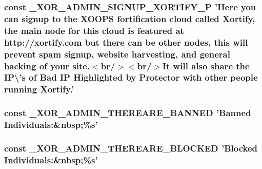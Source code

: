 \hypertarget{admin_8php_a5d647b6b983396b3837a2c6327c0c5d8}{
\subsubsection[{\-\_\-\-X\-O\-R\-\_\-\-A\-D\-M\-I\-N\-\_\-\-S\-I\-G\-N\-U\-P\-\_\-\-X\-O\-R\-T\-I\-F\-Y\-\_\-\-P}]{\setlength{\rightskip}{0pt plus 5cm}const \-\_\-\-X\-O\-R\-\_\-\-A\-D\-M\-I\-N\-\_\-\-S\-I\-G\-N\-U\-P\-\_\-\-X\-O\-R\-T\-I\-F\-Y\-\_\-\-P 'Here you can signup to the X\-O\-O\-P\-S fortification cloud called Xortify, the main node for this cloud is featured at http\-://xortify.\-com but there can be other nodes, this will prevent spam signup, website harvesting, and general hacking of your site.$<$br/$>$$<$br/$>$It will also share the I\-P\textbackslash{}'s of Bad I\-P Highlighted by Protector with other people running Xortify.'}}\label{admin_8php_a5d647b6b983396b3837a2c6327c0c5d8}
\hypertarget{admin_8php_a834918998aca006f698e20c388cf89e5}{
\subsubsection[{\-\_\-\-X\-O\-R\-\_\-\-A\-D\-M\-I\-N\-\_\-\-T\-H\-E\-R\-E\-A\-R\-E\-\_\-\-B\-A\-N\-N\-E\-D}]{\setlength{\rightskip}{0pt plus 5cm}const \-\_\-\-X\-O\-R\-\_\-\-A\-D\-M\-I\-N\-\_\-\-T\-H\-E\-R\-E\-A\-R\-E\-\_\-\-B\-A\-N\-N\-E\-D 'Banned Individuals\-:\&nbsp;\%s'}}\label{admin_8php_a834918998aca006f698e20c388cf89e5}
\hypertarget{admin_8php_ae91edf969356174ec66dc2592084b91f}{
\subsubsection[{\-\_\-\-X\-O\-R\-\_\-\-A\-D\-M\-I\-N\-\_\-\-T\-H\-E\-R\-E\-A\-R\-E\-\_\-\-B\-L\-O\-C\-K\-E\-D}]{\setlength{\rightskip}{0pt plus 5cm}const \-\_\-\-X\-O\-R\-\_\-\-A\-D\-M\-I\-N\-\_\-\-T\-H\-E\-R\-E\-A\-R\-E\-\_\-\-B\-L\-O\-C\-K\-E\-D 'Blocked Individuals\-:\&nbsp;\%s'}}\label{admin_8php_ae91edf969356174ec66dc2592084b91f}
